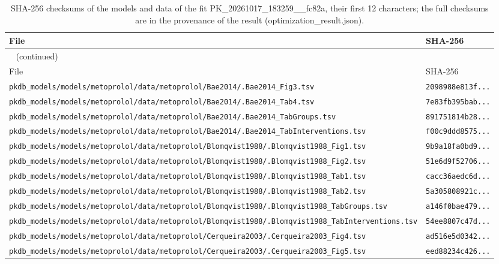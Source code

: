 \begin{longtable}{ll}
\caption{SHA-256 checksums of the models and data of the fit PK\_20261017\_183259\_\_fc82a, their first 12 characters; the full checksums are in the provenance of the result (optimization\_result.json).}\label{tab:checksums:PK_20261017_183259__fc82a} \\
\toprule
File & SHA-256 \\
\midrule
\endfirsthead
\multicolumn{2}{l}{\small\tablename~\thetable{} (continued)} \\
\toprule
File & SHA-256 \\
\midrule
\endhead
\bottomrule
\endlastfoot
\texttt{pkdb\_models/models/metoprolol/data/metoprolol/Bae2014/.Bae2014\_Fig3.tsv} & \texttt{2098988e813f...} \\
\texttt{pkdb\_models/models/metoprolol/data/metoprolol/Bae2014/.Bae2014\_Tab4.tsv} & \texttt{7e83fb395bab...} \\
\texttt{pkdb\_models/models/metoprolol/data/metoprolol/Bae2014/.Bae2014\_TabGroups.tsv} & \texttt{891751814b28...} \\
\texttt{pkdb\_models/models/metoprolol/data/metoprolol/Bae2014/.Bae2014\_TabInterventions.tsv} & \texttt{f00c9ddd8575...} \\
\texttt{pkdb\_models/models/metoprolol/data/metoprolol/Blomqvist1988/.Blomqvist1988\_Fig1.tsv} & \texttt{9b9a18fa0bd9...} \\
\texttt{pkdb\_models/models/metoprolol/data/metoprolol/Blomqvist1988/.Blomqvist1988\_Fig2.tsv} & \texttt{51e6d9f52706...} \\
\texttt{pkdb\_models/models/metoprolol/data/metoprolol/Blomqvist1988/.Blomqvist1988\_Tab1.tsv} & \texttt{cacc36aedc6d...} \\
\texttt{pkdb\_models/models/metoprolol/data/metoprolol/Blomqvist1988/.Blomqvist1988\_Tab2.tsv} & \texttt{5a305808921c...} \\
\texttt{pkdb\_models/models/metoprolol/data/metoprolol/Blomqvist1988/.Blomqvist1988\_TabGroups.tsv} & \texttt{a146f0bae479...} \\
\texttt{pkdb\_models/models/metoprolol/data/metoprolol/Blomqvist1988/.Blomqvist1988\_TabInterventions.tsv} & \texttt{54ee8807c47d...} \\
\texttt{pkdb\_models/models/metoprolol/data/metoprolol/Cerqueira2003/.Cerqueira2003\_Fig4.tsv} & \texttt{ad516e5d0342...} \\
\texttt{pkdb\_models/models/metoprolol/data/metoprolol/Cerqueira2003/.Cerqueira2003\_Fig5.tsv} & \texttt{eed88234c426...} \\

\end{longtable}

